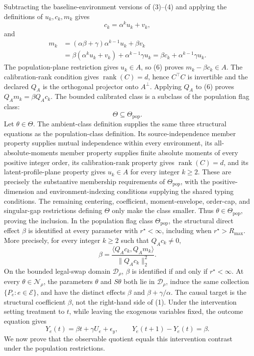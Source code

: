 Subtracting the baseline-environment versions of (3)--(4) and applying the definitions of \(u_k,c_k,m_k\) gives
\[
 c_k=\alpha^ku_k+v_k,                                                       \tag{5}
\]
and
\[
 \begin{aligned}
 m_k
 &=(\alpha\beta+\gamma)\alpha^{k-1}u_k+\beta v_k\\
 &=\beta(\alpha^ku_k+v_k)+\alpha^{k-1}\gamma u_k
  =\beta c_k+\alpha^{k-1}\gamma u_k.
 \end{aligned}                                                            \tag{6}
\]
The population-plane restriction gives \(u_k\in A\), so (6) proves \(m_k-\beta c_k\in A\).  The calibration-rank condition gives \(\operatorname{rank}(C)=d\), hence \(C^\top C\) is invertible and the declared \(Q_A\) is the orthogonal projector onto \(A^\perp\).  Applying \(Q_A\) to (6) proves \(Q_Am_k=\beta Q_Ac_k\).
The bounded calibrated class is a subclass of the population flag class:
\[
 \Theta\subseteq\Theta_{\mathrm{pop}}.
\]
Let \(\theta\in\Theta\).  The ambient-class definition supplies the same three structural equations as the population-class definition.  Its source-independence member property supplies mutual independence within every environment, its all-absolute-moments member property supplies finite absolute moments of every positive integer order, its calibration-rank property gives \(\operatorname{rank}(C)=d\), and its latent-profile-plane property gives \(u_k\in A\) for every integer \(k\geq2\).  These are precisely the substantive membership requirements of \(\Theta_{\mathrm{pop}}\), with the positive-dimension and environment-indexing conditions supplying the shared typing conditions.  The remaining centering, coefficient, moment-envelope, order-cap, and singular-gap restrictions defining \(\Theta\) only make the class smaller.  Thus \(\theta\in\Theta_{\mathrm{pop}}\), proving the inclusion.
In the population flag class \(\Theta_{\mathrm{pop}}\), the structural direct effect \(\beta\) is identified at every parameter with \(r^\star<\infty\), including when \(r^\star>R_{\max}\).  More precisely, for every integer \(k\geq2\) such that \(Q_Ac_k\neq0\),
\[
 \beta=\frac{\langle Q_Ac_k,Q_Am_k\rangle}
              {\lVert Q_Ac_k\rVert_2^2}.                                  \tag{1}
\]
On the bounded legal-swap domain \(\mathcal D_\rho\), \(\beta\) is identified if and only if \(r^\star<\infty\).  At every \(\theta\in\mathcal N_\rho\), the parameters \(\theta\) and \(S\theta\) both lie in \(\mathcal D_\rho\), induce the same collection \(\{P_e:e\in\mathcal E\}\), and have the distinct effects \(\beta\) and \(\beta+\gamma/\alpha\).
The causal target is the structural coefficient \(\beta\), not the right-hand side of (1).  Under the intervention setting treatment to \(t\), while leaving the exogenous variables fixed, the outcome equation gives
\[
 Y_e(t)=\beta t+\gamma U_e+\epsilon_y,
 \qquad Y_e(t+1)-Y_e(t)=\beta.                                             \tag{2}
\]
We now prove that the observable quotient equals this intervention contrast under the population restrictions.

